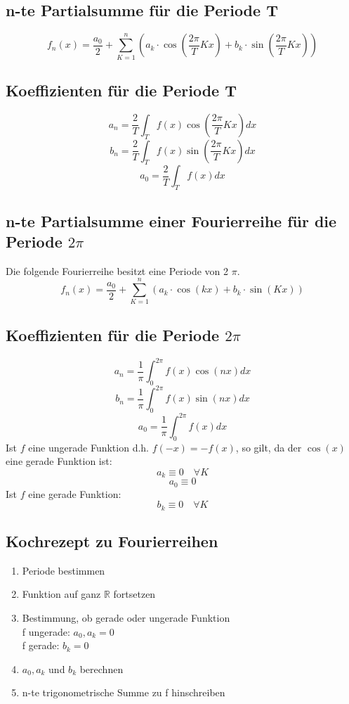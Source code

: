 \subsection{n-te Partialsumme für die Periode T}
\[ \boxed{f_n(x) = \frac{a_0}{2} + \sum_{K=1}^n \left(a_k \cdot \cos \left(\frac{2 \pi}{T} K x\right) + b_k \cdot \sin\left(\frac{2 \pi}{T} K x\right)\right)} \]

\subsection{Koeffizienten für die Periode T}
\[ \boxed{a_n = \frac{2}{T} \int_T f(x) \cos(\frac{2 \pi}{T} K x) dx} \]
\[ \boxed{b_n = \frac{2}{T} \int_T f(x) \sin(\frac{2 \pi}{T} K x) dx} \]
\[ \boxed{a_0 = \frac{2}{T} \int_T f(x) dx
} \]

\subsection{n-te Partialsumme einer Fourierreihe für die Periode $2\pi$}
Die folgende Fourierreihe besitzt eine Periode von 2 $\pi$. 
\[ \boxed{f_n(x) = \frac{a_0}{2} + \sum_{K=1}^n \left(a_k \cdot \cos(kx) + b_k \cdot \sin(Kx)\right)} \]

\subsection{Koeffizienten für die Periode $2\pi$}
\[ \boxed{a_n = \frac{1}{\pi} \int_0^{2 \pi} f(x) \cos(nx) dx} \]
\[ \boxed{b_n = \frac{1}{\pi} \int_0^{2 \pi} f(x) \sin(nx) dx} \]
\[ \boxed{a_0 = \frac{1}{\pi} \int_0^{2 \pi} f(x) dx
} \]
Ist $f$ eine ungerade Funktion d.h. $f(-x) = -f(x)$, so gilt, da der $\cos(x)$ eine gerade Funktion ist: 
\[ a_k \equiv 0 \quad \forall K\]
\[ a_0 \equiv 0 \]
Ist $f$ eine gerade Funktion: 
\[ b_k \equiv 0 \quad \forall K \]

\subsection{Kochrezept zu Fourierreihen}
\begin{enumerate}
  \item Periode bestimmen
  \item Funktion auf ganz $\mathbb{R}$ fortsetzen
  \item Bestimmung, ob gerade oder ungerade Funktion\\
  f ungerade: $a_0, a_k = 0$\\
  f gerade: $b_k = 0$
  \item $a_0, a_k$ und $b_k$ berechnen
  \item n-te trigonometrische Summe zu f hinschreiben
\end{enumerate}

